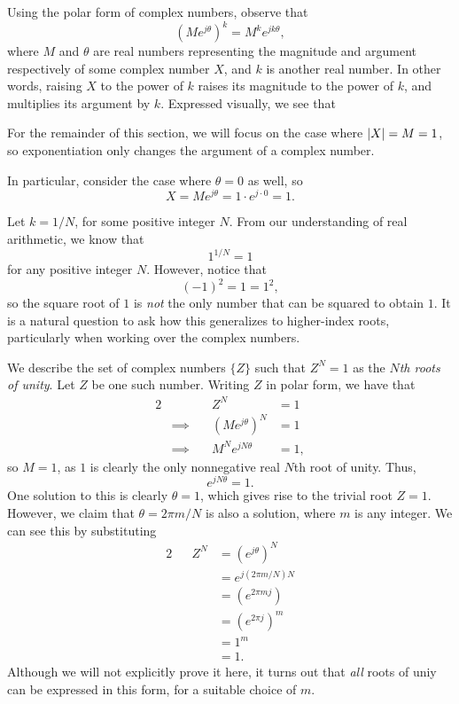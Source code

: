 \documentclass[letterpaper]{article}
\theoremstyle{remark}
\newcommand{\eqn}[1]{\begin{alignat*}{2}#1\end{alignat*}}
\newcommand*{\thus}{&\implies\quad&}
\begin{document}
Using the polar form of complex numbers, observe that
\[
    (Me^{j\theta})^k = M^k e^{jk\theta},
\]
where $M$ and $\theta$ are real numbers representing the magnitude and argument respectively of some complex number $X$, and $k$ is another real number. In other words, raising $X$ to the power of $k$ raises its magnitude to the power of $k$, and multiplies its argument by $k$. Expressed visually, we see that
\begin{center}
\end{center}

For the remainder of this section, we will focus on the case where $\abs{X} = M = 1$, so exponentiation only changes the argument of a complex number.

In particular, consider the case where $\theta = 0$ as well, so
\[
    X = Me^{j\theta} = 1 \cdot e^{j \cdot 0} = 1.
\]

Let $k = 1 / N$, for some positive integer $N$. From our understanding of real arithmetic, we know that
\[
    1^{1/N} = 1
\]
for any positive integer $N$. However, notice that
\[
    (-1)^2 = 1 = 1^2,
\]
so the square root of $1$ is \emph{not} the only number that can be squared to obtain $1$. It is a natural question to ask how this generalizes to higher-index roots, particularly when working over the complex numbers.

We describe the set of complex numbers $\{ Z \}$ such that $Z^N = 1$ as the \emph{$N$th roots of unity}. Let $Z$ be one such number. Writing $Z$ in polar form, we have that
\eqn{
    && Z^N &= 1 \\
    \thus (Me^{j\theta})^N &= 1 \\
    \thus M^N e^{jN\theta} &= 1,
}
so $M = 1$, as $1$ is clearly the only nonnegative real $N$th root of unity. Thus,
\[
    e^{jN\theta} = 1.
\]
One solution to this is clearly $\theta = 1$, which gives rise to the trivial root $Z = 1$. However, we claim that $\theta = 2\pi m / N$ is also a solution, where $m$ is any integer. We can see this by substituting
\eqn{
    && Z^N &= (e^{j\theta})^N \\
    &&&= e^{j(2\pi m / N) N} \\
    &&&= (e^{2 \pi m j}) \\
    &&&= (e^{2 \pi j})^m \\
    &&&= 1^m \\
    &&&= 1.
}
Although we will not explicitly prove it here, it turns out that \emph{all} roots of uniy can be expressed in this form, for a suitable choice of $m$.
\end{document}

